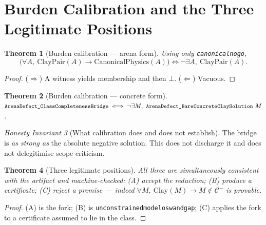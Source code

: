 \documentclass[11pt,a4paper]{article}
\theoremstyle{plain}
\newtheorem{theorem}{Theorem}[section]
\theoremstyle{definition}
\theoremstyle{remark}
\newtheorem{invariant}[theorem]{Honesty Invariant}
\newcommand{\Class}{\mathcal{C}}\newcommand{\Htot}{\mathcal{H}}
\renewcommand{\_}{\oldunderscore\allowbreak}
\newcommand{\Lean}[1]{\texttt{\small #1}}
\begin{document}
\section{Burden Calibration and the Three Legitimate Positions}\label{sec:burden}
\begin{theorem}[Burden calibration --- arena form]\label{thm:burden}
Using only \Lean{canonical\_no\_go},
\[
\Big(\forall A,\ \mathrm{ClayPair}(A)\to\mathrm{CanonicalPhysics}(A)\Big)
\iff \neg\exists A,\ \mathrm{ClayPair}(A).
\]
\end{theorem}
\begin{proof}
($\Rightarrow$) A witness yields membership and then $\bot$. ($\Leftarrow$) Vacuous.
\end{proof}
\begin{theorem}[Burden calibration --- concrete form]\label{thm:burden2}
$\Lean{ArenaDefect\_ClassCompletenessBridge}\iff
\neg\exists M,\ \Lean{ArenaDefect\_BareConcreteClaySolution}\ M$.
\end{theorem}
\begin{invariant}[What calibration does and does not establish]\label{inv:calibration}
The bridge is \emph{as strong as} the absolute negative solution. This does not discharge it and
does not delegitimise scope criticism.
\end{invariant}
\begin{theorem}[Three legitimate positions]\label{thm:positions}
All three are simultaneously consistent with the artifact and machine-checked:
(A) accept the reduction; (B) produce a certificate; (C) reject a premise --- indeed
$\forall M,\ \mathrm{Clay}(M)\to M\notin\Class^-$ is \emph{provable}.
\end{theorem}
\begin{proof}
(A) is the fork; (B) is \Lean{unconstrained\_model\_osw\_and\_gap}; (C) applies the fork to a
certificate assumed to lie in the class.
\end{proof}
\end{document}
